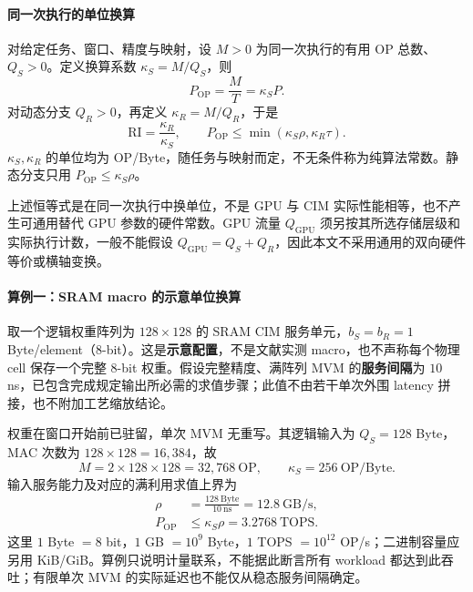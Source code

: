 \documentclass[11pt, a4paper]{ctexart}
\theoremstyle{definition}
\newcommand{\RI}{\mathrm{RI}}
\begin{document}
\paragraph{同一次执行的单位换算}
\label{para:kappa_def}
对给定任务、窗口、精度与映射，设 $M>0$ 为同一次执行的有用 OP 总数、$Q_S>0$。定义换算系数 $\kappa_S=M/Q_S$，则
\begin{equation}
P_{\mathrm{OP}}=\frac{M}{T}=\kappa_S P.
\label{eq:payload_to_ops}
\end{equation}
对动态分支 $Q_R>0$，再定义 $\kappa_R=M/Q_R$，于是
\begin{equation}
\RI=\frac{\kappa_R}{\kappa_S},\qquad
P_{\mathrm{OP}}\le\min(\kappa_S\rho,\kappa_R\tau).
\label{eq:RI_kappa}
\end{equation}
$\kappa_S,\kappa_R$ 的单位均为 OP/Byte，随任务与映射而定，不无条件称为纯算法常数。静态分支只用 $P_{\mathrm{OP}}\le\kappa_S\rho$。

上述恒等式是在同一次执行中换单位，不是 GPU 与 CIM 实际性能相等，也不产生可通用替代 GPU 参数的硬件常数。GPU 流量 $Q_{\mathrm{GPU}}$ 须另按其所选存储层级和实际执行计数，一般不能假设 $Q_{\mathrm{GPU}}=Q_S+Q_R$，因此本文不采用通用的双向硬件等价或横轴变换。

\paragraph{算例一：SRAM macro 的示意单位换算}
\label{para:sram_example}
取一个逻辑权重阵列为 $128\times128$ 的 SRAM CIM 服务单元，$b_S=b_R=1$ Byte/element（8-bit）。这是\textbf{示意配置}，不是文献实测 macro，也不声称每个物理 cell 保存一个完整 8-bit 权重。假设完整精度、满阵列 MVM 的\textbf{服务间隔}为 $10$ ns，已包含完成规定输出所必需的求值步骤；此值不由若干单次外围 latency 拼接，也不附加工艺缩放结论。

权重在窗口开始前已驻留，单次 MVM 无重写。其逻辑输入为 $Q_S=128$ Byte，MAC 次数为 $128\times128=16{,}384$，故
\[
M=2\times128\times128=32{,}768\ \mathrm{OP},\qquad
\kappa_S=256\ \mathrm{OP}/\mathrm{Byte}.
\]
输入服务能力及对应的满利用求值上界为
\begin{equation}
\begin{aligned}
\rho&=\frac{128\ \mathrm{Byte}}{10\ \mathrm{ns}}=12.8\ \mathrm{GB}/\mathrm{s},\\
P_{\mathrm{OP}}&\le\kappa_S\rho=3.2768\ \mathrm{TOPS}.
\end{aligned}
\label{eq:tops_demystify}
\end{equation}
这里 $1$ Byte $=8$ bit，$1$ GB $=10^9$ Byte，$1$ TOPS $=10^{12}$ OP/s；二进制容量应另用 KiB/GiB。算例只说明计量联系，不能据此断言所有 workload 都达到此吞吐；有限单次 MVM 的实际延迟也不能仅从稳态服务间隔确定。
\end{document}
